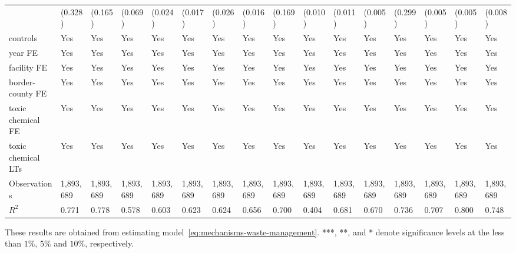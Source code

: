 \begin{table}[H]
{\begin{tabular}{@{}llllllllllllllll@{}}
            & (0.328)   & (0.165)   & (0.069)   & (0.024)    & (0.017)   & (0.026)   & (0.016)   & (0.169)         & (0.010)   & (0.011)  & (0.005)  & (0.299)  & (0.005)  & (0.005)       & (0.008)         \\
            controls           & Yes       & Yes       & Yes       & Yes        & Yes       & Yes       & Yes       & Yes             & Yes       & Yes       & Yes       & Yes       & Yes       & Yes            & Yes              \\
            year FE            & Yes       & Yes       & Yes       & Yes        & Yes       & Yes       & Yes       & Yes             & Yes       & Yes       & Yes       & Yes       & Yes       & Yes            & Yes              \\
            facility FE        & Yes       & Yes       & Yes       & Yes        & Yes       & Yes       & Yes       & Yes             & Yes       & Yes       & Yes       & Yes       & Yes       & Yes            & Yes              \\
            border-county FE   & Yes       & Yes       & Yes       & Yes        & Yes       & Yes       & Yes       & Yes             & Yes       & Yes       & Yes       & Yes       & Yes       & Yes            & Yes              \\
            toxic chemical FE  & Yes       & Yes       & Yes       & Yes        & Yes       & Yes       & Yes       & Yes             & Yes       & Yes       & Yes       & Yes       & Yes       & Yes            & Yes              \\
            toxic chemical LTs & Yes       & Yes       & Yes       & Yes        & Yes       & Yes       & Yes       & Yes             & Yes       & Yes       & Yes       & Yes       & Yes       & Yes            & Yes              \\ \midrule
            Observations       & 1,893,689 & 1,893,689 & 1,893,689 & 1,893,689  & 1,893,689 & 1,893,689 & 1,893,689 & 1,893,689       & 1,893,689 & 1,893,689 & 1,893,689 & 1,893,689 & 1,893,689 & 1,893,689      & 1,893,689        \\
            $R^2$              & 0.771     & 0.778     & 0.578     & 0.603      & 0.623     & 0.624     & 0.656     & 0.700           & 0.404     & 0.681     & 0.670     & 0.736     & 0.707    & 0.800         & 0.748           \\ \bottomrule \bottomrule
        \end{tabular}%
    }
    \begin{minipage}{18cm}
        \vspace{0.05in}
        These results are obtained from estimating model~\ref{eq:mechanisms-waste-management}. ***, **, and * denote significance levels at the less than $1\%$, $5\%$ and $10\%$, respectively.
    \end{minipage}
\end{table}